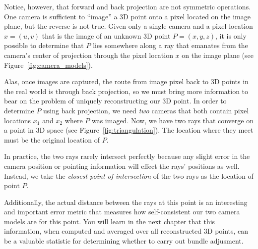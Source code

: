 Notice, however, that forward and back projection are not symmetric
operations.  One camera is sufficient to ``image'' a 3D point onto a
pixel located on the image plane, but the reverse is not true.  Given
only a single camera and a pixel location $x = (u,v)$ that is the
image of an unknown 3D point $P = (x,y,z)$, it is only possible to
determine that $P$ lies somewhere along a ray that emanates from the
camera's center of projection through the pixel location $x$ on the
image plane (see Figure~\ref{fig:camera_models}).

Alas, once images are captured, the route from image pixel back to 3D
points in the real world is through back projection, so we must bring
more information to bear on the problem of uniquely reconstructing our
3D point.  In order to determine $P$ using back projection, we need
{\em two} cameras that both contain pixel locations $x_1$ and $x_2$
where $P$ was imaged.  Now, we have two rays that converge on a point
in 3D space (see Figure~\ref{fig:triangulation}). The location where
they meet must be the original location of $P$.

In practice, the two rays rarely intersect perfectly because any
slight error in the camera position or pointing information will
effect the rays' positions as well.  Instead, we take the {\em closest
  point of intersection} of the two rays as the location of point $P$.

Additionally, the actual distance between the rays at this point is an
interesting and important error metric that measures how
self-consistent our two camera models are for this point.  You will
learn in the next chapter that this information, when computed and
averaged over all reconstructed 3D points, can be a valuable statistic for
determining whether to carry out bundle adjusment.





